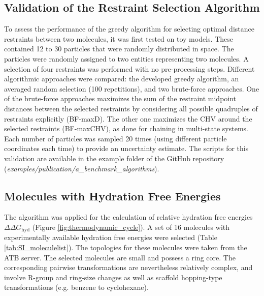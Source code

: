 
\subsection{Validation of the Restraint Selection Algorithm}
To assess the performance of the greedy algorithm for selecting optimal distance restraints between two molecules, it was first tested on toy models. These contained 12 to 30 particles that were randomly distributed in space. The particles were randomly assigned to two entities representing two molecules. A selection of four restraints was performed with no pre-processing steps. Different algorithmic approaches were compared: the developed greedy algorithm, an averaged random selection (100 repetitions), and two brute-force approaches. One of the brute-force approaches maximizes the sum of the restraint midpoint distances between the selected restraints by considering all possible quadruples of restraints explicitly (BF-maxD). The other one maximizes the CHV around the selected restraints (BF-maxCHV), as done for chaining in multi-state systems. Each number of particles was sampled 20 times (using different particle coordinates each time) to provide an uncertainty estimate. The scripts for this validation are available in the example folder of the GitHub repository (\textit{examples/publication/a\_benchmark\_algorithms}).

\subsection{Molecules with Hydration Free Energies}
The algorithm was applied for the calculation of relative hydration free energies $\Delta \Delta G_{\text{hyd}}$ (Figure \ref{fig:thermodynamic_cycle}).
A set of 16 molecules with experimentally available hydration free energies\cite{Wolfenden1987,Rizzo2006,Nicholls2008,Guthrie2009,Guthrie2014,Mobley2014} were selected (Table \ref{tab:SI_moleculelist}). 
The topologies for these molecules were taken from the ATB server.\cite{Stroet2018} The selected molecules are small and possess a ring core. The corresponding pairwise transformations are nevertheless relatively complex, and involve R-group and ring-size changes as well as scaffold hopping-type transformations (e.g. benzene to cyclohexane).

